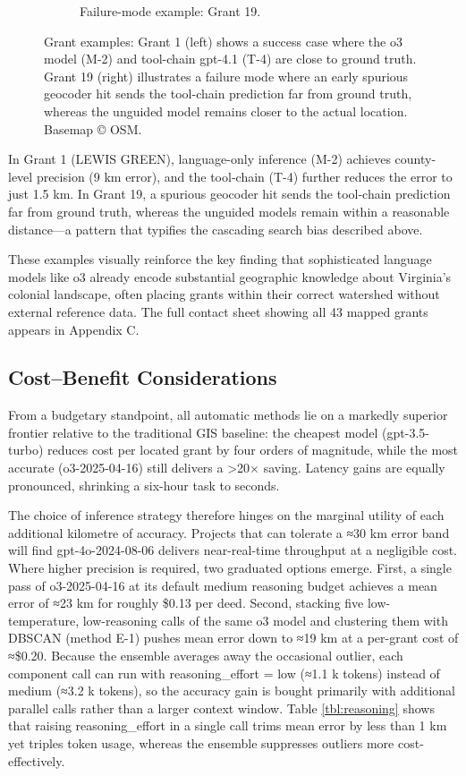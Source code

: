 \begin{figure}[H]
\begin{subfigure}{0.48\textwidth}
  \caption{Failure-mode example: Grant 19.}
  \label{fig:grant19}
\end{subfigure}
\caption{Grant examples: Grant 1 (left) shows a success case where the o3 model (M-2) and tool-chain gpt-4.1 (T-4) are close to ground truth. Grant 19 (right) illustrates a failure mode where an early spurious geocoder hit sends the tool-chain prediction far from ground truth, whereas the unguided model remains closer to the actual location. Basemap © OSM.}
\label{fig:grant_maps}
\end{figure}

In Grant 1 (LEWIS GREEN), language-only inference (M-2) achieves
county-level precision (9 km error), and the tool-chain (T-4) further
reduces the error to just 1.5 km. In Grant 19, a spurious geocoder hit
sends the tool-chain prediction far from ground truth, whereas the
unguided models remain within a reasonable distance---a pattern that
typifies the cascading search bias described above.

These examples visually reinforce the key finding that sophisticated
language models like o3 already encode substantial geographic knowledge
about Virginia's colonial landscape, often placing grants within their
correct watershed without external reference data. The full contact
sheet showing all 43 mapped grants appears in Appendix C.

\subsection{Cost--Benefit
Considerations}\label{costbenefit-considerations}

From a budgetary standpoint, all automatic methods lie on a markedly
superior frontier relative to the traditional GIS baseline: the cheapest
model (gpt-3.5-turbo) reduces cost per located grant by four orders of
magnitude, while the most accurate (o3-2025-04-16) still delivers a
\textgreater20× saving. Latency gains are equally pronounced, shrinking
a six-hour task to seconds.

The choice of inference strategy therefore hinges on the marginal
utility of each additional kilometre of accuracy. Projects that can
tolerate a ≈30 km error band will find gpt-4o-2024-08-06 delivers
near-real-time throughput at a negligible cost. Where higher precision
is required, two graduated options emerge. First, a single pass of
o3-2025-04-16 at its default medium reasoning budget achieves a mean
error of ≈23 km for roughly \$0.13 per deed. Second, stacking five
low-temperature, low-reasoning calls of the same o3 model and clustering
them with DBSCAN (method E-1) pushes mean error down to ≈19 km at a
per-grant cost of ≈\$0.20. Because the ensemble averages away the
occasional outlier, each component call can run with reasoning\_effort =
low (≈1.1 k tokens) instead of medium (≈3.2 k tokens), so the accuracy
gain is bought primarily with additional parallel calls rather than a
larger context window. Table \ref{tbl:reasoning} shows that raising
reasoning\_effort in a single call trims mean error by less than 1 km
yet triples token usage, whereas the ensemble suppresses outliers more
cost-effectively.


